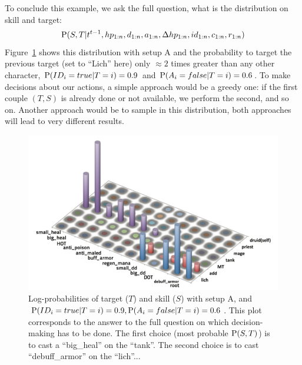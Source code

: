 To conclude this example, we ask the full question, what is the distribution on skill and target:
$$\mathrm{P}(S,T|t^{t-1},hp_{1:n},d_{1:n}, a_{1:n}, \Delta hp_{1:n}, id_{1:n}, c_{1:n}, r_{1:n})$$
Figure~\ref{fig:wow_target_skill} shows this distribution %
with setup A and the probability to target the previous target (set to ``Lich'' here) only $\approx 2$ times greater than any other character, %
$\mathrm{P}(ID_i=true|T=i)=0.9$ and $\mathrm{P}(A_i=false|T=i)=0.6$. To make decisions about our actions, a simple approach would be a greedy one: if the first couple $(T,S)$ is already done or not available, we perform the second, and so on. Another approach would be to sample in this distribution, both approaches will lead to very different results. 

\begin{figure}[h!]
\begin{center}
\includegraphics[width=0.92\columnwidth]{images/wow_distrib_target_skill.png}
\caption{Log-probabilities of target ($T$) and skill ($S$) with setup A, and $\mathrm{P}(ID_i=true|T=i)=0.9, \mathrm{P}(A_i=false|T=i)=0.6$. This plot corresponds to the answer to the full question on which decision-making has to be done. The first choice (most probable $\mathrm{P}(S,T)$) is to cast a ``big\_heal'' on the ``tank''. The second choice is to cast ``debuff\_armor'' on the ``lich''...}
\label{fig:wow_target_skill}
\end{center}
\end{figure}

